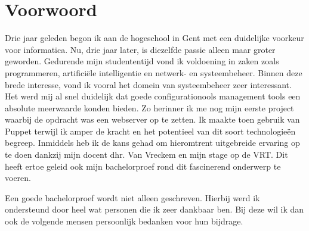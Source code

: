 
\chapter*{Voorwoord}
\label{ch:voorwoord}


Drie jaar geleden begon ik aan de hogeschool in Gent met een duidelijke voorkeur voor informatica. Nu, drie jaar later, is diezelfde passie alleen maar groter geworden. Gedurende mijn studententijd vond ik voldoening in zaken zoals programmeren, artifici\"ele intelligentie en netwerk- en systeembeheer. Binnen deze brede interesse, vond ik vooral het domein van systeembeheer zeer interessant.
 \newline
Het werd mij al snel duidelijk dat goede configurationools management tools een absolute meerwaarde konden bieden. Zo herinner ik me nog mijn eerste project waarbij de opdracht was een webserver op te zetten. Ik maakte toen gebruik van Puppet terwijl ik amper de kracht en het potentieel van dit soort technologie\"en begreep. Inmiddels heb ik de kans gehad om hieromtrent uitgebreide ervaring op te doen dankzij mijn docent dhr. Van Vreckem en mijn stage op de \gls{VRT}. Dit heeft ertoe geleid ook mijn bachelorproef rond dit fascinerend onderwerp te voeren.

Een goede bachelorproef wordt niet alleen geschreven. Hierbij werd ik ondersteund door heel wat personen die ik zeer dankbaar ben. Bij deze wil ik dan ook de volgende mensen persoonlijk bedanken voor hun bijdrage.

